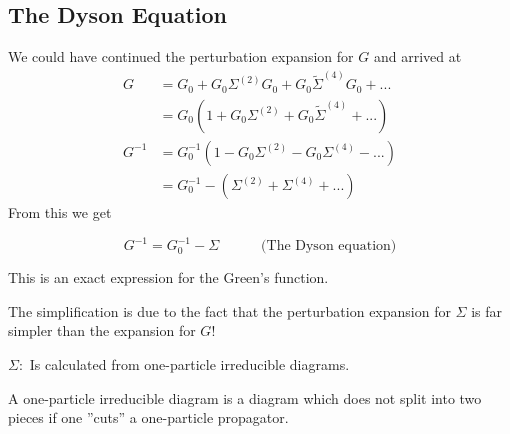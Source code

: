 \subsection{The Dyson Equation}
We could have continued the perturbation expansion for $G$ and arrived at
\[\begin{aligned}
    G &= G_0 + G_0\Sigma^{(2)}G_0 + G_0\tilde{\Sigma}^{(4)}G_0 + ...\\
    &= G_0(1 + G_0\Sigma^{(2)} + G_0\tilde{\Sigma}^{(4)} + ...)\\
    G^{-1} &= G_0^{-1}(1 - G_0\Sigma^{(2)} - G_0\Sigma^{(4)} - ...)\\
    &=G_0^{-1} - (\Sigma^{(2)} + \Sigma^{(4)}+...)
\end{aligned}\]
From this we get
\begin{Indentskip}
    \[G^{-1} = G_0^{-1} - \Sigma \quad\qquad \text{(The Dyson equation)}\]
\end{Indentskip}
This is an exact expression for the Green's function.

The simplification is due to the fact that the perturbation expansion for $\Sigma$ is far simpler than the expansion for $G$!

\begin{Indentskip}
    $\Sigma:$ Is calculated from one-particle irreducible diagrams.
\end{Indentskip}

A one-particle irreducible diagram is a diagram which does not split into two pieces if one ''cuts'' a one-particle propagator.

